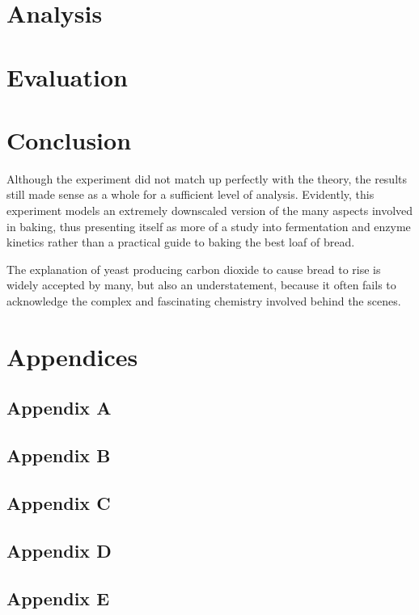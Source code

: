 \documentclass{article}
\begin{document}
\section{Analysis}

\section{Evaluation}

\section{Conclusion}
Although the experiment did not match up perfectly with the theory, the results still made sense as a whole for a sufficient level of analysis. Evidently, this experiment models an extremely downscaled version of the many aspects involved in baking, thus presenting itself as more of a study into fermentation and enzyme kinetics rather than a practical guide to baking the best loaf of bread.

\medskip

The explanation of yeast producing carbon dioxide to cause bread to rise is widely accepted by many, but also an understatement, because it often fails to acknowledge the complex and fascinating chemistry involved behind the scenes.

\nocite{*}

\newpage

\printbibliography

\newpage

\section{Appendices}

\subsection{Appendix A}

\subsection{Appendix B}

\subsection{Appendix C}

\subsection{Appendix D}

\subsection{Appendix E}
\end{document}
